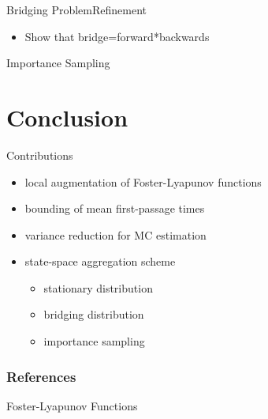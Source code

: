 \documentclass[10pt]{beamer}
\begin{document}
\begin{frame}{Bridging Problem}{Refinement}
    \begin{itemize}
        \item Show that bridge=forward*backwards
    \end{itemize}

\end{frame}

\begin{frame}{Importance Sampling}
    
\end{frame}

\section{Conclusion}
\begin{frame}{Contributions}
    \begin{itemize}
        \item local augmentation of Foster-Lyapunov functions
        \item bounding of mean first-passage times \parencite{backenkohler2019bounding}
        \item variance reduction for MC estimation \parencite{backenkohler2019control,backenkohler2021variance}
        \item state-space aggregation scheme
            \begin{itemize}
                \item stationary distribution \parencite{backenkohler2021abstraction}
                \item bridging distribution \parencite{backenkohler2020analysis}
                \item importance sampling
            \end{itemize}
    \end{itemize}
\end{frame}

\begin{frame}[allowframebreaks]
    \frametitle{References}
%        
    \printbibliography
\end{frame}

\iffalse
\begin{frame}{Foster-Lyapunov Functions}
\end{frame}
\end{document}

